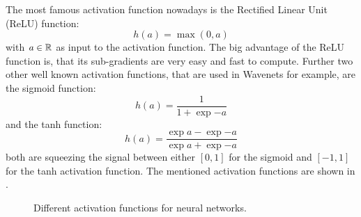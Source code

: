 The most famous activation function nowadays is the Rectified Linear Unit (ReLU) \cite{Zeiler2013_relu} function:
\begin{equation}\label{eq:nn_theory_relu}
  h(a) = \max{(0, a)}
\end{equation}
with $a \in \mathbb{R}$ as input to the activation function.
The big advantage of the ReLU function is, that its sub-gradients are very easy and fast to compute.
Further two other well known activation functions, that are used in Wavenets for example, are the sigmoid function:
\begin{equation}\label{eq:nn_theory_sigmoid}
  h(a) = \frac{1}{1 + \exp{-a}}
\end{equation}
and the tanh function:
\begin{equation}\label{eq:nn_theory_tanh}
  h(a) = \frac{\exp{a} - \exp{-a}}{\exp{a} + \exp{-a}}
\end{equation}
both are squeezing the signal between either $[0, 1]$ for the sigmoid and $[-1, 1]$ for the tanh activation function.
The mentioned activation functions are shown in .
\begin{figure}[!ht]
  \centering
  \caption{Different activation functions for neural networks.}
  \label{fig:nn_theory_activation}
\end{figure}
\FloatBarrier
\noindent


